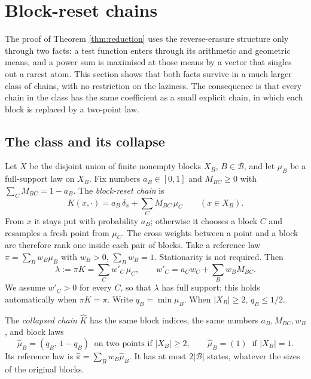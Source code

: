 \section{Block-reset chains}\label{sec:blockreset}

The proof of Theorem \ref{thm:reduction} uses the reverse-erasure structure
only through two facts: a test function enters through its arithmetic and
geometric means, and a power sum is maximised at those means by a vector that
singles out a rarest atom. This section shows that both facts survive in a
much larger class of chains, with no restriction on the laziness. The
consequence is that every chain in the class has the same coefficient as a
small explicit chain, in which each block is replaced by a two-point law.

\subsection{The class and its collapse}

Let \(X\) be the disjoint union of finite nonempty blocks \(X_B\),
\(B\in\mathcal B\), and let \(\mu_B\) be a full-support law on \(X_B\). Fix
numbers \(a_B\in[0,1]\) and \(M_{BC}\ge0\) with
\(\sum_C M_{BC}=1-a_B\). The \emph{block-reset chain} is
\begin{equation}\label{br:eq:K}
K(x,\cdot)=a_B\,\delta_x+\sum_{C}M_{BC}\,\mu_C\qquad(x\in X_B).
\end{equation}
From \(x\) it stays put with probability \(a_B\); otherwise it chooses a block
\(C\) and resamples a fresh point from \(\mu_C\). The cross weights between a
point and a block are therefore rank one inside each pair of blocks.
Take a reference law \(\pi=\sum_B w_B\mu_B\) with \(w_B>0\),
\(\sum_B w_B=1\). Stationarity is not required. Then
\begin{equation}\label{br:eq:output}
\lambda:=\pi K=\sum_C w'_C\,\mu_C,\qquad
w'_C=a_Cw_C+\sum_B w_B M_{BC}.
\end{equation}
We assume \(w'_C>0\) for every \(C\), so that \(\lambda\) has full support;
this holds automatically when \(\pi K=\pi\).
Write \(q_B=\min\mu_B\). When \(|X_B|\ge2\), \(q_B\le1/2\).

The \emph{collapsed chain} \(\widehat K\) has the same block indices,
the same numbers \(a_B,M_{BC},w_B\), and block laws
\[
\widehat\mu_B=(q_B,\,1-q_B)\ \text{ on two points if }|X_B|\ge2,\qquad
\widehat\mu_B=(1)\ \text{ if }|X_B|=1.
\]
Its reference law is \(\widehat\pi=\sum_B w_B\widehat\mu_B\). It has at most
\(2|\mathcal B|\) states, whatever the sizes of the original blocks.

